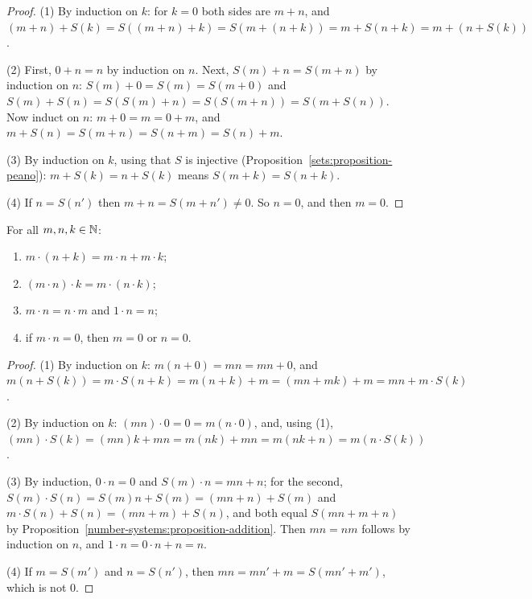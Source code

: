 \begin{proof}
(1) By induction on $k$: for $k = 0$ both sides are $m + n$, and
$(m + n) + S(k) = S((m + n) + k) = S(m + (n + k)) = m + S(n + k) = m + (n + S(k))$.

(2) First, $0 + n = n$ by induction on $n$. Next, $S(m) + n = S(m + n)$ by
induction on $n$: $S(m) + 0 = S(m) = S(m + 0)$ and
$S(m) + S(n) = S(S(m) + n) = S(S(m + n)) = S(m + S(n))$. Now induct on $n$:
$m + 0 = m = 0 + m$, and $m + S(n) = S(m + n) = S(n + m) = S(n) + m$.

(3) By induction on $k$, using that $S$ is injective
(Proposition~\ref{sets:proposition-peano}):
$m + S(k) = n + S(k)$ means $S(m + k) = S(n + k)$.

(4) If $n = S(n')$ then $m + n = S(m + n') \neq 0$. So $n = 0$, and then $m = 0$.
\end{proof}

\begin{proposition}\label{number-systems:proposition-multiplication}
For all $m, n, k \in \mathbb{N}$:
\begin{enumerate}
\item $m \cdot (n + k) = m \cdot n + m \cdot k$;
\item $(m \cdot n) \cdot k = m \cdot (n \cdot k)$;
\item $m \cdot n = n \cdot m$ and $1 \cdot n = n$;
\item if $m \cdot n = 0$, then $m = 0$ or $n = 0$.
\end{enumerate}
\end{proposition}

\begin{proof}
(1) By induction on $k$: $m(n + 0) = mn = mn + 0$, and
$m(n + S(k)) = m \cdot S(n + k) = m(n + k) + m = (mn + mk) + m = mn + m \cdot S(k)$.

(2) By induction on $k$: $(mn) \cdot 0 = 0 = m(n \cdot 0)$, and, using (1),
$(mn) \cdot S(k) = (mn)k + mn = m(nk) + mn = m(nk + n) = m(n \cdot S(k))$.

(3) By induction, $0 \cdot n = 0$ and $S(m) \cdot n = mn + n$; for the second,
$S(m) \cdot S(n) = S(m) n + S(m) = (mn + n) + S(m)$ and
$m \cdot S(n) + S(n) = (mn + m) + S(n)$, and both equal $S(mn + m + n)$ by
Proposition~\ref{number-systems:proposition-addition}. Then $mn = nm$ follows by
induction on $n$, and $1 \cdot n = 0 \cdot n + n = n$.

(4) If $m = S(m')$ and $n = S(n')$, then $mn = mn' + m = S(mn' + m')$, which is
not $0$.
\end{proof}

